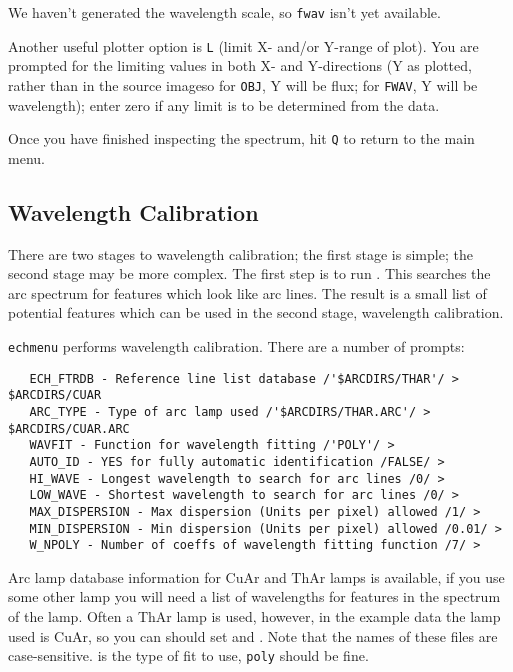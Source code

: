 We haven't generated the wavelength scale, so \verb+fwav+ isn't yet
available.

Another useful plotter option is \verb+L+ (limit X- and/or Y-range of plot).
You are prompted for the limiting values in both X- and Y-directions
(Y as plotted, rather than in the source image\scspec{---}{ - }so for
\verb+OBJ+, Y will be flux; for \verb+FWAV+, Y will be wavelength); enter
zero if any limit is to be determined from the data.

Once you have finished inspecting the spectrum, hit \verb+Q+ to return to
the main menu.


\subsection{Wavelength Calibration}

There are two stages to 
wavelength calibration; the first stage is simple; the second stage may
be more complex.
The first step is to run
\@.
This searches the arc spectrum for features which look like arc lines.
The result is a small list of potential features which can be used in
the second stage, wavelength calibration.

\verb+echmenu+ 
performs wavelength calibration.
There are a number of prompts:

{
\scspec{\small}{ }
\begin{verbatim}
   ECH_FTRDB - Reference line list database /'$ARCDIRS/THAR'/ > $ARCDIRS/CUAR
   ARC_TYPE - Type of arc lamp used /'$ARCDIRS/THAR.ARC'/ > $ARCDIRS/CUAR.ARC
   WAVFIT - Function for wavelength fitting /'POLY'/ >
   AUTO_ID - YES for fully automatic identification /FALSE/ >
   HI_WAVE - Longest wavelength to search for arc lines /0/ >
   LOW_WAVE - Shortest wavelength to search for arc lines /0/ >
   MAX_DISPERSION - Max dispersion (Units per pixel) allowed /1/ >
   MIN_DISPERSION - Min dispersion (Units per pixel) allowed /0.01/ >
   W_NPOLY - Number of coeffs of wavelength fitting function /7/ >
\end{verbatim}
}

Arc lamp database information for CuAr and ThAr lamps is available,
if you use some other lamp you will need a list of wavelengths for
features in the spectrum of the lamp.  Often a ThAr lamp is used,
however, in the example data the lamp used is CuAr,
so you can should set
 and
\@.
Note that the names of these files are case-sensitive.
 is the type of fit to use,
\verb+poly+ should be fine.

